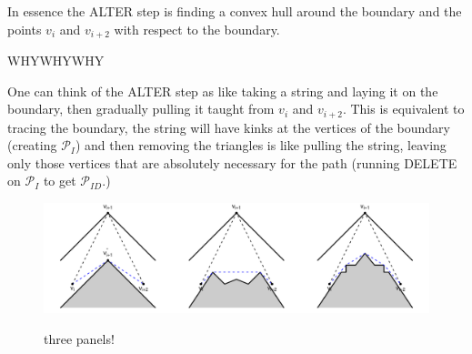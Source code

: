In essence the ALTER step is finding a convex hull around the boundary and the points $v_{i}$ and $v_{i+2}$ with respect to the boundary.


WHYWHYWHY



One can think of the ALTER step as like taking a string and laying it on the boundary, then gradually pulling it taught from $v_i$ and $v_{i+2}$. This is equivalent to tracing the boundary, the string will have kinks at the vertices of the boundary (creating $\mathcal{P}_I$) and then removing the triangles is like pulling the string, leaving only those vertices that are absolutely necessary for the path (running DELETE on $\mathcal{P}_I$ to get $\mathcal{P}_{ID}$.)





\begin{figure}
\centering
\includegraphics[width=6in]{app-WAD/figs/alterstep-proof.pdf} \\
\caption{three panels!}
\label{app-WAD-alterstep-dia}
\end{figure}


